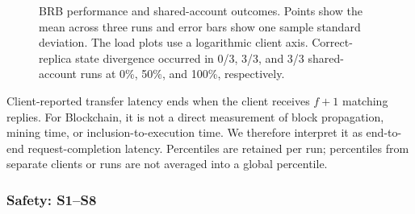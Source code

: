 \documentclass[sigconf,a4paper]{acmart}
\begin{document}
\begin{figure}[t]
        \caption{BRB performance and shared-account outcomes. Points show the
        mean across three runs and error bars show one sample standard deviation.
        The load plots use a logarithmic client axis. Correct-replica state
        divergence occurred in 0/3, 3/3, and 3/3 shared-account runs at 0\%,
        50\%, and 100\%, respectively.}
        \label{fig:brb-results}
    \end{figure}

    Client-reported transfer latency ends when the client receives $f+1$
    matching replies. For Blockchain, it is not a direct measurement of block
    propagation, mining time, or inclusion-to-execution time. We therefore
    interpret it as end-to-end request-completion latency. Percentiles are
    retained per run; percentiles from separate clients or runs are not averaged
    into a global percentile.

    \subsubsection{Safety: S1--S8}
    \label{subsec:eval-brb-safety}
\end{document}
